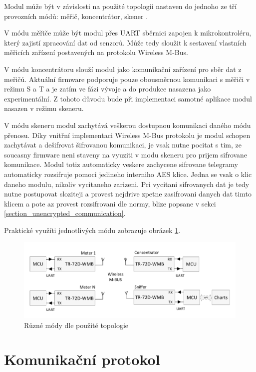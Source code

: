 Modul může být v závislosti na použité topologii nastaven do jednoho ze tří provozních módů: měřič, koncentrátor, skener \cite{iqrfmodul}. 

V módu měřiče může být modul přes UART sběrnici zapojen k mikrokontroléru, který zajistí zpracování dat od senzorů. Může tedy sloužit k sestavení vlastních měřicích zařízení postavených na protokolu Wireless M-Bus.

V módu koncentrátoru slouží modul jako komunikační zařízení pro sběr dat z meřičů. Aktuální firmware podporuje pouze obousměrnou komunikaci s měřiči v režimu S a T a je zatím ve fázi vývoje a do produkce nasazena jako experimentální. Z tohoto důvodu bude při implementaci samotné aplikace modul nasazen v režimu skeneru.

V módu skeneru modul zachytává veškerou dostupnou komunikaci daného módu přenosu. Díky vnitřní implementaci Wireless M-Bus protokolu je modul schopen zachytávat a dešifrovat šifrovanou komunikaci, je vsak nutne pocitat s tim, ze soucasny firmware neni staveny na vyuziti v modu skeneru pro prijem sifrovane komunikace. Modul totiz automaticky veskere zachycene sifrovane telegramy automaticky rozsifruje pomoci jedineho interniho AES klice. Jedna se vsak o klic daneho modulu, nikoliv vycitaneho zarizeni. Pri vycitani sifrovanych dat je tedy nutne postupovat sloziteji a provest nejdrive zpetne zasifrovani danych dat timto klicem a pote az provest rozsifrovani dle normy, blize popsane v sekci \ref{section_unencrypted_communication}.

Praktické využíti jednotlivých módu zobrazuje obrázek \ref{TopologieIQRF}.

 \begin{figure}[!h]
  \begin{center}
    \includegraphics[scale=0.6]{obrazky/modul_topologie}
  \end{center}
  \caption{Různé módy dle použité topologie \cite{iqrfmodul}}
	\label{TopologieIQRF}
\end{figure}

\section{Komunikační protokol}

